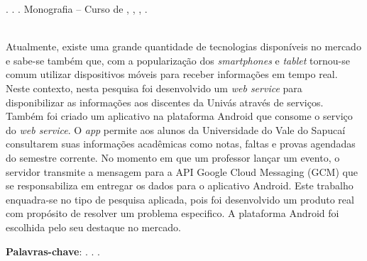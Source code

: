
\begin{OnehalfSpacing} 

\noindent \imprimirAutorCitacaoMaiuscula. {\bfseries\imprimirtitulo}.
 {\imprimirdata}.  Monografia -- Curso de {\MakeUppercase\imprimircurso},
 {\imprimirinstituicao}, {\imprimirlocal}, {\imprimirdata}.

\vspace{\onelineskip}
\vspace{\onelineskip}
\vspace{\onelineskip}
\vspace{\onelineskip}

\begin{resumo}
~\\
\noindent Atualmente, existe uma grande quantidade de tecnologias disponíveis
no mercado e sabe-se também que, com a popularização dos \textit{smartphones} e
\textit{tablet} tornou-se comum utilizar dispositivos móveis para receber
informações em tempo real. Neste contexto, nesta pesquisa foi desenvolvido um
\textit{web service} para disponibilizar as informações aos discentes da Univás
através de serviços. Também foi criado um aplicativo na plataforma Android que
consome o serviço do \textit{web service}. O \textit{app} permite aos alunos da
Universidade do Vale do Sapucaí consultarem suas informações acadêmicas como
notas, faltas e provas agendadas do semestre corrente. No momento em que um
professor lançar um evento, o servidor transmite a mensagem para a API Google
Cloud Messaging (GCM) que se responsabiliza em entregar os dados para o
aplicativo Android. Este trabalho enquadra-se no tipo de pesquisa aplicada,
pois foi desenvolvido um produto real com propósito de resolver um problema
especifico. A plataforma Android foi escolhida pelo seu destaque no mercado.

\vspace{\onelineskip}
\vspace*{\fill}
\noindent \textbf{Palavras-chave}: \imprimirPalavraChaveUm. \imprimirPalavraChaveDois. \imprimirPalavraChaveTres.
\vspace{\onelineskip}
\end{resumo}

\end{OnehalfSpacing}
